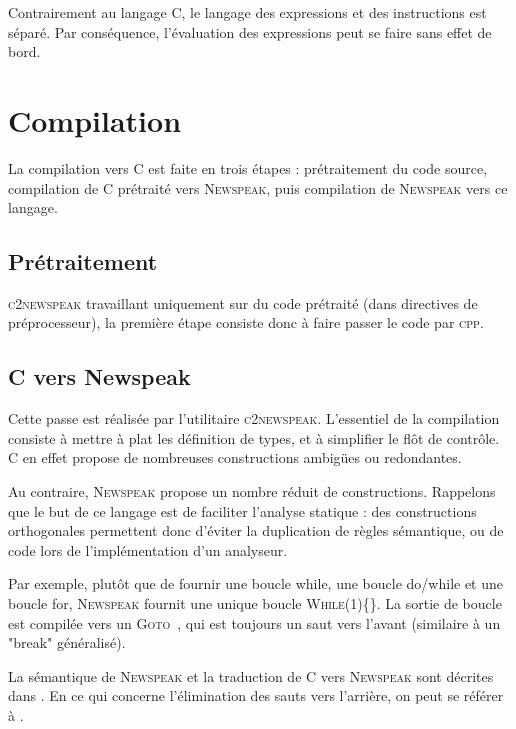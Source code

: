 \documentclass{article}
\newcommand{\ctonewspeak}{\textsc{c2newspeak}}
\newcommand{\cpp}{\textsc{cpp}}
\newcommand{\newspeak}{\textsc{Newspeak}}
\newcommand{\npkWhile}[1]{\textsc{While}(1)\{#1\}}
\newcommand{\npkGoto}[1]{\textsc{Goto}~#1}
\begin{document}



Contrairement au langage C, le langage des expressions et des instructions est
séparé. Par conséquence, l'évaluation des expressions peut se faire sans effet de
bord.

\section{Compilation}

La compilation vers C est faite en trois étapes : prétraitement du code source,
compilation de C prétraité vers \newspeak{}, puis compilation de \newspeak{}
vers ce langage.



\subsection{Prétraitement}

\ctonewspeak{} travaillant uniquement sur du code prétraité (dans directives de
préprocesseur), la première étape consiste donc à faire passer le code par \cpp.

\subsection{C vers Newspeak}

Cette passe est réalisée par l'utilitaire \ctonewspeak{}. L'essentiel de la
compilation consiste à mettre à plat les définition de types, et à simplifier le
flôt de contrôle. C en effet propose de nombreuses constructions ambigües ou
redondantes.

Au contraire, \newspeak{} propose un nombre réduit de constructions. Rappelons
que le but de ce langage est de faciliter l'analyse statique : des constructions
orthogonales permettent donc d'éviter la duplication de règles sémantique, ou de
code lors de l'implémentation d'un analyseur.

Par exemple, plutôt que de fournir une boucle while, une boucle do/while et une
boucle for, \newspeak{} fournit une unique boucle \npkWhile{}. La sortie de
boucle est compilée vers un \npkGoto{}, qui est toujours un saut vers l'avant
(similaire à un "break" généralisé).

La sémantique de \newspeak{} et la traduction de C vers \newspeak{} sont
décrites dans \cite{npkSem}. En ce qui concerne l'élimination des sauts vers
l'arrière, on peut se référer à \cite{goto}.
\end{document}
